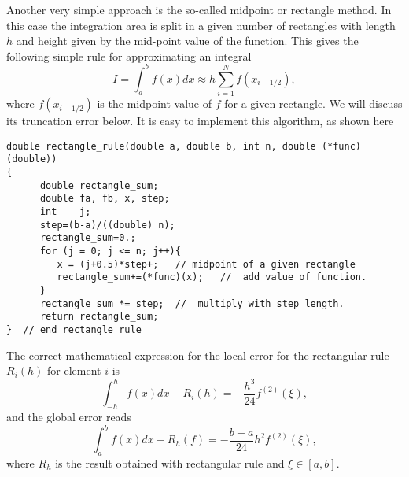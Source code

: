 Another very simple approach is the so-called midpoint or rectangle method.
In this case the integration area is split in a given number of rectangles with length $h$ and
height given by the mid-point value of the function.  This gives the following simple rule for
approximating an integral
\begin{equation}
   I=\int_a^bf(x) dx \approx  h\sum_{i=1}^N f(x_{i-1/2}), 
   \label{eq:rectangle}
\end{equation}
where $f(x_{i-1/2})$ is the midpoint value of $f$ for a given rectangle. We will discuss its truncation 
error below.  It is easy to implement this algorithm,  as shown here
\lstset{language=c++}
\begin{lstlisting}
double rectangle_rule(double a, double b, int n, double (*func)(double))
{
      double rectangle_sum;
      double fa, fb, x, step;
      int    j;
      step=(b-a)/((double) n);
      rectangle_sum=0.;
      for (j = 0; j <= n; j++){
         x = (j+0.5)*step+;   // midpoint of a given rectangle
         rectangle_sum+=(*func)(x);   //  add value of function.
      }
      rectangle_sum *= step;  //  multiply with step length.
      return rectangle_sum;
}  // end rectangle_rule 
\end{lstlisting}
The correct mathematical expression for the local error for the rectangular rule $R_i(h)$ for element $i$ is
\[
\int_{-h}^hf(x)dx - R_i(h)=-\frac{h^3}{24}f^{(2)}(\xi),
\]
and the global error reads
\[
\int_a^bf(x)dx -R_h(f)=-\frac{b-a}{24}h^2f^{(2)}(\xi),
\]
where $R_h$ is the result obtained with rectangular rule and $\xi \in [a,b]$.

